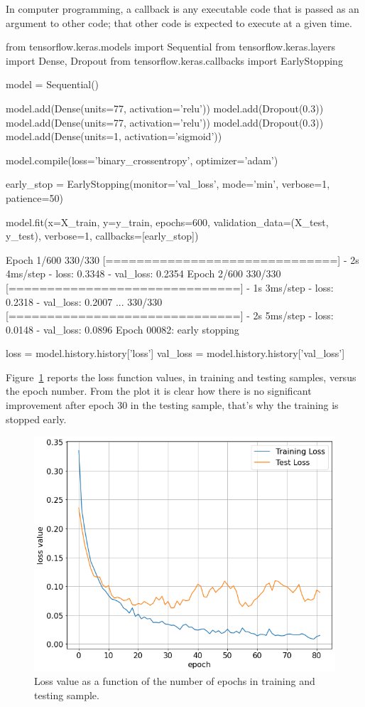 In computer programming, a callback is any executable code that is passed as an argument to other code; that other code is expected to execute at a given time.

\begin{ipython}
from tensorflow.keras.models import Sequential
from tensorflow.keras.layers import Dense, Dropout
from tensorflow.keras.callbacks import EarlyStopping
	
model = Sequential()
	
model.add(Dense(units=77, activation='relu'))
model.add(Dropout(0.3))
model.add(Dense(units=77, activation='relu'))
model.add(Dropout(0.3))
model.add(Dense(units=1, activation='sigmoid'))
	
model.compile(loss='binary_crossentropy', optimizer='adam')
	
early_stop = EarlyStopping(monitor='val_loss', 
                           mode='min', 
                           verbose=1, 
                           patience=50)
	
model.fit(x=X_train, y=y_train,
          epochs=600,
          validation_data=(X_test, y_test), 
          verbose=1, callbacks=[early_stop])
\end{ipython}
\begin{ioutput}
Epoch 1/600
330/330 [==============================] - 2s 4ms/step - loss: 0.3348 
- val_loss: 0.2354
Epoch 2/600
330/330 [==============================] - 1s 3ms/step - loss: 0.2318 
- val_loss: 0.2007
...
330/330 [==============================] - 2s 5ms/step - loss: 0.0148 
- val_loss: 0.0896
Epoch 00082: early stopping
\end{ioutput}

\begin{ipython}
loss = model.history.history['loss']
val_loss = model.history.history['val_loss']
\end{ipython}

Figure~\ref{fig:bankruptcy_loss} reports the loss function values, in training and testing samples, versus the epoch number. From the plot it is clear how there is no significant improvement after epoch 30 in the testing sample, that's why the training is stopped early.

\begin{figure}[htbp]
\centering
\includegraphics[width=0.7\linewidth]{figures/bankruptcy_loss}
\caption{Loss value as a function of the number of epochs in training and testing sample.}
\label{fig:bankruptcy_loss}
\end{figure}

